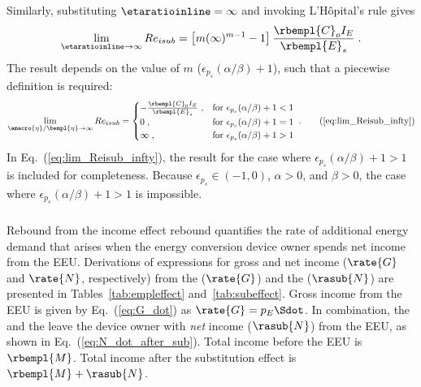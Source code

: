 Similarly, 
substituting $\etaratioinline = \infty$ and invoking L'H\^{o}pital's rule gives
%
\begin{equation}
  \lim_{\etaratioinline \to \infty} Re_{isub} 
        = \left[ m ( \infty )^{m-1} - 1 \right] \frac{\rbempl{C}_o I_E}{\rbempl{E}_s} \; .
\end{equation}
%
The result depends on the value of $m$ ($\epsilon_{p_s} (\alpha/\beta) + 1$),
such that a piecewise definition is required:
%
\begin{equation}
  \lim_{\amacro{\eta}/\bempl{\eta} \to \infty} Re_{isub} =
  \begin{cases}
    -\frac{\rbempl{C}_0 I_E}{\rbempl{E}_s} \; , & \text{for } \epsilon_{p_s} (\alpha/\beta) + 1 < 1 \\
    0 \; ,                                      & \text{for } \epsilon_{p_s} (\alpha/\beta) + 1 = 1 \\
    \infty \; ,                                 & \text{for } \epsilon_{p_s} (\alpha/\beta) + 1 > 1 \\
  \end{cases} \; . \tag{\ref{eq:lim_Reisub_infty}}
\end{equation}
%
In Eq.~(\ref{eq:lim_Reisub_infty}), 
the result for the case where $\epsilon_{p_s} (\alpha/\beta) + 1 > 1$ 
is included for completeness.
Because $\epsilon_{p_s} \in (-1, 0)$, $\alpha > 0$, and $\beta > 0$,
the case where
$\epsilon_{p_s} (\alpha/\beta) + 1 > 1$ is impossible.


\subsubsection{\Inceffect{}} 
\label{sec:Re_inc}

Rebound from the income effect rebound quantifies the rate of additional energy demand 
that arises when the energy conversion device owner spends net
income from the EEU.
Derivations of expressions for gross and net income ($\rate{G}$ and $\rate{N}$, respectively) from the 
\empleffect{} ($\rate{G}$) and the \subeffect{} ($\rasub{N}$)
are presented in Tables~\ref{tab:empleffect} and~\ref{tab:subeffect}.
Gross income from the EEU is given by Eq.~(\ref{eq:G_dot})
as $\rate{G} = p_E \Sdot$. 
In combination, the \empleffect{} and the \subeffect{} leave the device owner with
\emph{net} income ($\rasub{N}$) from the EEU,
as shown in Eq.~(\ref{eq:N_dot_after_sub}).
Total income before the EEU is $\rbempl{M}$.
Total income after the substitution effect is $\rbempl{M} + \rasub{N}$.

